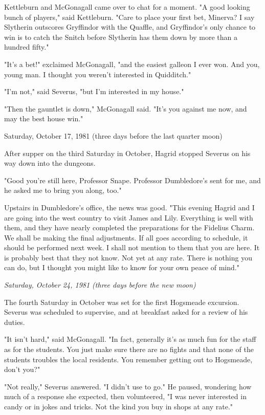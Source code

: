 \documentclass[a4paper,11pt]{article}
\begin{document}
Kettleburn and McGonagall came over to chat for a moment. "A good looking bunch of players," said Kettleburn. "Care to place your first bet, Minerva? I say Slytherin outscores Gryffindor with the Quaffle, and Gryffindor's only chance to win is to catch the Snitch before Slytherin has them down by more than a hundred fifty."

"It's a bet!" exclaimed McGonagall, "and the easiest galleon I ever won. And you, young man. I thought you weren't interested in Quidditch."

"I'm not," said Severus, "but I'm interested in my house."

"Then the gauntlet is down," McGonagall said. "It's you against me now, and may the best house win."

Saturday, October 17, 1981 (three days before the last quarter moon)

After supper on the third Saturday in October, Hagrid stopped Severus on his way down into the dungeons.

"Good you're still here, Professor Snape. Professor Dumbledore's sent for me, and he asked me to bring you along, too."

Upstairs in Dumbledore's office, the news was good. "This evening Hagrid and I are going into the west country to visit James and Lily. Everything is well with them, and they have nearly completed the preparations for the Fidelius Charm. We shall be making the final adjustments. If all goes according to schedule, it should be performed next week. I shall not mention to them that you are here. It is probably best that they not know. Not yet at any rate. There is nothing you can do, but I thought you might like to know for your own peace of mind."

\emph{Saturday, October 24, 1981 (three days before the new moon)}

The fourth Saturday in October was set for the first Hogsmeade excursion. Severus was scheduled to supervise, and at breakfast asked for a review of his duties.

"It isn't hard," said McGonagall. "In fact, generally it's as much fun for the staff as for the students. You just make sure there are no fights and that none of the students troubles the local residents. You remember getting out to Hogsmeade, don't you?"

"Not really," Severus answered. "I didn't use to go." He paused, wondering how much of a response she expected, then volunteered, "I was never interested in candy or in jokes and tricks. Not the kind you buy in shops at any rate."
\end{document}
